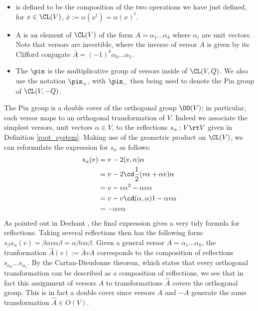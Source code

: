 \begin{definition}\label{pin_group_defn}\begin{itemize}
  \item {} is defined to be the composition of the two operations we have just defined, for $x\in \CL(V)$, $\bar{x}:=\alpha(x^t)=\alpha(x)^t$.

  \item A  is an element of $\CL(V)$ of the form $A=\alpha_1\dots \alpha_k$ where $\alpha_i$ are unit vectors. Note that versors are invertible, where the inverse of versor $A$ is given by its Clifford conjugate $\bar{A}=(-1)^k \alpha_k\dots \alpha_1$.
  
  \item The  $\pin$ is the multiplicative group of versors inside of $\CL(V,Q)$. We also use the notation $\pin_+$, with $\pin_-$ then being used to denote the Pin group of $\CL(V,-Q)$.
\end{itemize}
\end{definition}

\nt The Pin group is a double cover of the orthogonal group $\OO(V)$; in particular, each versor maps to an orthogonal transformation of $V$. Indeed we associate the simplest versors, unit vectors $\alpha\in V$, to the reflections $s_\alpha:V\rt V$ given in Definition \ref{root_system}. Making use of the geometric product on $\CL(V)$, we can reformulate the expression for $s_\alpha$ as follows:
\begin{align*}
  s_\alpha(v) & =v-2(v,\alpha)\alpha\\
  & = v-2\cd \frac{1}{2}(v\alpha+\alpha v)\alpha\\
  & = v-v\alpha^2 -\alpha v\alpha\\
  & = v-v\cd (\alpha,\alpha)1-\alpha v\alpha\\
  & =-\alpha v\alpha
\end{align*}
As pointed out in Dechant \cite{dechant}, the final expression gives a very tidy formula for reflections. Taking several reflections then has the following form: $s_\beta s_\alpha(v)=\beta\alpha v \alpha\beta=\overline{\alpha\beta}v\alpha\beta$. Given a general versor $A=\alpha_1\dots \alpha_k$, the tranformation $\hat{A}(v):=\bar{A}vA$ corresponds to the composition of reflections $s_{\alpha_k} \dots  s_{\alpha_1}$. By the Cartan-Dieudonne theorem, which states that every orthogonal transformation can be described as a composition of reflections, we see that in fact this assignment of versors $A$ to transformations $\hat{A}$ covers the orthogonal group. This is in fact a double cover since versors $A$ and $-A$ generate the same transformation $\hat{A}\in O(V)$.\bb

